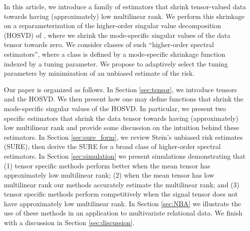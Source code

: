 

In this article, we introduce a family of estimators that shrink
tensor-valued data towards having (approximately) low multilinear
rank. We perform this shrinkage on a reparameterization of the
higher-order singular value decomposition (HOSVD) of
\cite{de2000multilinear}, where we shrink the mode-specific singular
values of the data tensor towards zero. We consider classes of such
``higher-order spectral estimators'', where a class is defined by a
mode-specific shrinkage function indexed by a tuning parameter. We
propose to adaptively select the tuning parameters by minimization of
an unbiased estimate of the risk.



Our paper is organized as follows. In Section \ref{sec:tensor}, we
introduce tensors and the HOSVD. We then present how one may define
functions that shrink the mode-specific singular values of the
HOSVD. In particular, we present two specific estimators that shrink
the data tensor towards having (approximately) low multilinear rank
and provide some discussion on the intuition behind these
estimators. In Section \ref{sec:sure_form}, we review Stein's unbiased
risk estimates (SURE), then derive the SURE for a broad class of
higher-order spectral estimators. In Section \ref{sec:simulation} we
present simulations demonstrating that (1) tensor specific methods
perform better when the mean tensor has approximately low multilinear
rank; (2) when the mean tensor has low multilinear rank our methods
accurately estimate the multilinear rank; and (3) tensor specific
methods perform competitively when the signal tensor does not have
approximately low multilinear rank. In Section \ref{sec:NBA} we
illustrate the use of these methods in an application to multivariate
relational data. We finish with a discussion in Section
\ref{sec:discussion}.

